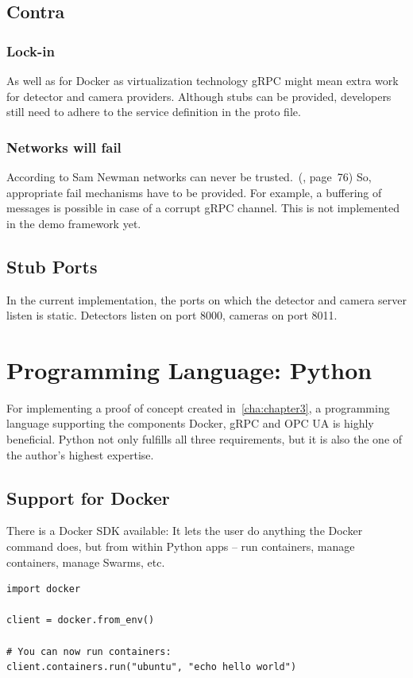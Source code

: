\subsection{Contra}
\subsubsection{Lock-in}
As well as for Docker as virtualization technology gRPC might mean extra work for detector and camera providers. Although stubs can be provided, developers still need to adhere to the service definition in the proto file.
\subsubsection{Networks will fail}
According to Sam Newman networks can never be trusted.~(\cite{Newman2015BuildingMicroservices}, page~76) So, appropriate fail mechanisms have to be provided. For example, a buffering of messages is possible in case of a corrupt gRPC channel. This is not implemented in the demo framework yet.

\subsection{Stub Ports}
In the current implementation, the ports on which the detector and camera server listen is static. Detectors listen on port 8000, cameras on port 8011. 

\section{Programming Language: Python}
For implementing a proof of concept created in~\ref{cha:chapter3}, a programming language supporting the components Docker, gRPC and OPC UA is highly beneficial. Python not only fulfills all three requirements, but it is also the one of the author's highest expertise.

\subsection{Support for Docker}
There is a Docker SDK available: It lets the user do anything the Docker command does, but from within Python apps – run containers, manage containers, manage Swarms, etc.~\cite{N.A.Docker2019}
\begin{verbatim}
import docker

client = docker.from_env()

# You can now run containers:
client.containers.run("ubuntu", "echo hello world")
\end{verbatim}

